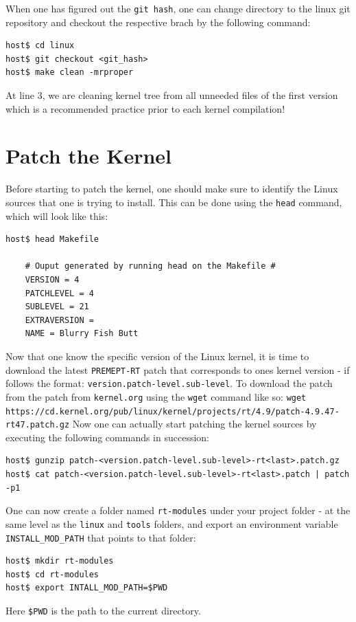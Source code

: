 \documentclass[a4paper,oneside,onecolumn]{article}
\newcommand{\code}[1]{\colorbox{codegray}{\texttt{#1}}}
\begin{document}
When one has figured out the \texttt{git hash}, one can change directory to the linux git repository and checkout the respective brach by the following command:
\begin{lstlisting}
host$ cd linux
host$ git checkout <git_hash>
host$ make clean -mrproper
\end{lstlisting}
At line 3, we are cleaning kernel tree from all unneeded files of the first version which is a recommended practice prior to each kernel compilation!

\section{Patch the Kernel}

\noindent
Before starting to patch the kernel, one should make sure to identify the Linux sources that one is trying to install. This can be done using the \code{head} command, which will look like this:
\begin{lstlisting}
host$ head Makefile

	# Ouput generated by running head on the Makefile #
	VERSION = 4
	PATCHLEVEL = 4
	SUBLEVEL = 21
	EXTRAVERSION = 
	NAME = Blurry Fish Butt
\end{lstlisting}
Now that one know the specific version of the Linux kernel, it is time to download the latest \texttt{PREMEPT-RT} patch that corresponds to ones kernel version - if follows the format: \texttt{version.patch-level.sub-level}.
\newline
To download the patch from the patch from \texttt{kernel.org} using the \code{wget} command like so: 
\newline
\code{wget https://cd.kernel.org/pub/linux/kernel/projects/rt/4.9/patch-4.9.47-rt47.patch.gz}
\newline
\newline
Now one can actually start patching the kernel sources by executing the following commands in succession:
\begin{lstlisting}
host$ gunzip patch-<version.patch-level.sub-level>-rt<last>.patch.gz
host$ cat patch-<version.patch-level.sub-level>-rt<last>.patch | patch -p1
\end{lstlisting}
One can now create a folder named \texttt{rt-modules} under your project folder - at the same level as the \texttt{linux} and \texttt{tools} folders, and export an environment variable \texttt{INSTALL\_MOD\_PATH} that points to that folder:
\begin{lstlisting}
host$ mkdir rt-modules
host$ cd rt-modules
host$ export INTALL_MOD_PATH=$PWD
\end{lstlisting}
Here \code{\$PWD} is the path to the current directory.
\end{document}
